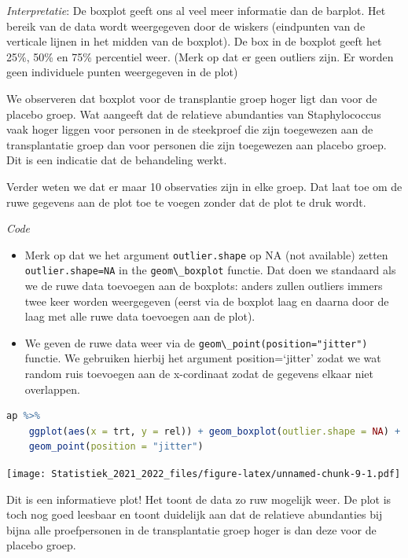 \documentclass[
  12pt,dutch,coursenotes]{book}
\newcommand{\passthrough}[1]{#1}
\providecommand{\tightlist}{%
  \setlength{\itemsep}{0pt}\setlength{\parskip}{0pt}}
\theoremstyle{definition}
\theoremstyle{definition}
\theoremstyle{definition}
\theoremstyle{definition}
\theoremstyle{remark}
\begin{document}
\emph{Interpretatie}: De boxplot geeft ons al veel meer informatie dan de barplot. Het bereik van de data wordt weergegeven door de wiskers (eindpunten van de verticale lijnen in het midden van de boxplot). De box in de boxplot geeft het 25\%, 50\% en 75\% percentiel weer. (Merk op dat er geen outliers zijn. Er worden geen individuele punten weergegeven in de plot)

We observeren dat boxplot voor de transplantie groep hoger ligt dan voor de placebo groep. Wat aangeeft dat de relatieve abundanties van Staphylococcus vaak hoger liggen voor personen in de steekproef die zijn toegewezen aan de transplantatie groep dan voor personen die zijn toegewezen aan placebo groep. Dit is een indicatie dat de behandeling werkt.

Verder weten we dat er maar 10 observaties zijn in elke groep. Dat laat toe om de ruwe gegevens aan de plot toe te voegen zonder dat de plot te druk wordt.

\emph{Code}

\begin{itemize}
\tightlist
\item
  Merk op dat we het argument \passthrough{\lstinline!outlier.shape!} op NA (not available) zetten \passthrough{\lstinline!outlier.shape=NA!} in the \passthrough{\lstinline!geom\_boxplot!} functie. Dat doen we standaard als we de ruwe data toevoegen aan de boxplots: anders zullen outliers immers twee keer worden weergegeven (eerst via de boxplot laag en daarna door de laag met alle ruwe data toevoegen aan de plot).
\item
  We geven de ruwe data weer via de \passthrough{\lstinline!geom\_point(position="jitter")!} functie. We gebruiken hierbij het argument position=`jitter' zodat we wat random ruis toevoegen aan de x-cordinaat zodat de gegevens elkaar niet overlappen.
\end{itemize}

\begin{lstlisting}[language=R]
ap %>%
    ggplot(aes(x = trt, y = rel)) + geom_boxplot(outlier.shape = NA) +
    geom_point(position = "jitter")
\end{lstlisting}

\texttt{[image: Statistiek\_2021\_2022\_files/figure-latex/unnamed-chunk-9-1.pdf]}

Dit is een informatieve plot!
Het toont de data zo ruw mogelijk weer. De plot is toch nog goed leesbaar en toont duidelijk aan dat de relatieve abundanties bij bijna alle proefpersonen in de transplantatie groep hoger is dan deze voor de placebo groep.
\end{document}
